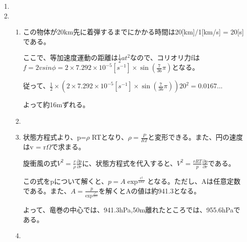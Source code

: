 \documentclass{jsarticle}
\newenvironment{problems}
{
  \renewcommand\labelenumi{\doublebox{\arabic{enumi}}}
  \begin{enumerate}
}{
  \end{enumerate}
  \renewcommand\labelenumi{\arabic{enumi}.}
}
\begin{document}
\begin{problems}
変数:  λ:経度, φ:緯度, a:地球の半径, f:摩擦力, u:x方向(緯線)の速度, v:y方向(経線)の速度, ρ: 気体の密度, p: 気圧, g:重力加速度
\item 

\item 
	\begin{enumerate}[(1)]
        \item 

        この物体が20km先に着弾するまでにかかる時間は20[km]/1[km/s] = 20[s]である。

        ここで、等加速度運動の距離は$\frac{1}{2}at^2$なので、コリオリ力fは$f=2vsin\phi =2\times7.292 \times 10^{-5}[s^{-1}] \times\sin(\frac{7}{36}\pi)$となる。
        
        従って、$\frac{1}{2} \times (2\times7.292 \times 10^{-5}[s^{-1}] \times\sin(\frac{7}{36}\pi)) 20^2 = 0.0167... $
        
        よって約16mずれる。

        \item

        \item
状態方程式より、p=$\rho$ RTとなり、$\rho = \frac{P}{RT}$と変形できる。また、円の速度はv = r$\Omega$で求まる。

旋衝風の式$V^2 = \frac{r}{\rho}\frac{\partial p}{\partial r}$に、状態方程式を代入すると、$V^2 = \frac{rRT}{p}\frac{\partial p}{\partial r}$である。

この式をpについて解くと、$p = A\exp^{\frac{r^2}{2RT}}$となる。ただし、Aは任意定数である。また、$A = \frac{p}{\exp^{\frac{r^2}{2RT}}}$を解くとAの値は約941.3となる。

よって、竜巻の中心では、941.3hPa,50m離れたところでは、955.6hPaである。

        \item
    \end{enumerate}
\end{problems}
\end{document}
